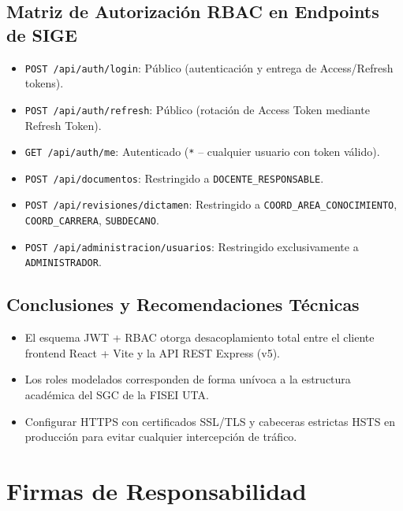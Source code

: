 \documentclass[12pt,a4paper]{article}
\begin{document}
\subsection{Matriz de Autorización RBAC en Endpoints de SIGE}
\begin{itemize}[leftmargin=1.5em, itemsep=2pt]
    \item \texttt{POST /api/auth/login}: Público (autenticación y entrega de Access/Refresh tokens).
    \item \texttt{POST /api/auth/refresh}: Público (rotación de Access Token mediante Refresh Token).
    \item \texttt{GET /api/auth/me}: Autenticado (\texttt{*} -- cualquier usuario con token válido).
    \item \texttt{POST /api/documentos}: Restringido a \texttt{DOCENTE\_RESPONSABLE}.
    \item \texttt{POST /api/revisiones/dictamen}: Restringido a \texttt{COORD\_AREA\_CONOCIMIENTO}, \texttt{COORD\_CARRERA}, \texttt{SUBDECANO}.
    \item \texttt{POST /api/administracion/usuarios}: Restringido exclusivamente a \texttt{ADMINISTRADOR}.
\end{itemize}

\subsection{Conclusiones y Recomendaciones Técnicas}
\begin{itemize}[leftmargin=1.5em, itemsep=2pt]
    \item El esquema JWT + RBAC otorga desacoplamiento total entre el cliente frontend React + Vite y la API REST Express (v5).
    \item Los roles modelados corresponden de forma unívoca a la estructura académica del SGC de la FISEI UTA.
    \item Configurar HTTPS con certificados SSL/TLS y cabeceras estrictas HSTS en producción para evitar cualquier intercepción de tráfico.
\end{itemize}

\vspace{0.3cm}

\section{Firmas de Responsabilidad}
\end{document}

